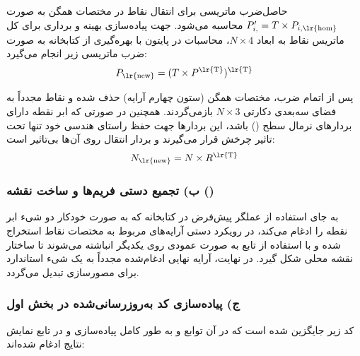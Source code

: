 \documentclass[12pt,a4paper]{article}
\begin{document}
حاصل‌ضرب ماتریسی برای انتقال نقاط در مختصات همگن به صورت $P'_{i,\text{}}=T\times P_{i,\text{\lr{hom}}}$ محاسبه می‌شود. جهت پیاده‌سازی بهینه و برداری برای کل ماتریس نقاط به ابعاد $N\times4$، محاسبات در پایتون با بهره‌گیری از کتابخانه  به صورت ضرب ماتریسی زیر انجام می‌گیرد:
$$P_{\text{\lr{new}}}=(T\times P^{\text{\lr{T}}})^{\text{\lr{T}}}$$

پس از اتمام ضرب، مختصات همگن (ستون چهارم آرایه) حذف شده و نقاط مجدداً به فضای سه‌بعدی دکارتی $N\times3$ بازمی‌گردند. همچنین در صورتی که ابر نقطه دارای بردارهای نرمال سطح () باشد، این بردارها جهت حفظ راستای هندسی خود تنها تحت تاثیر چرخش قرار می‌گیرند و بردار انتقال روی آن‌ها بی‌تاثیر است:
$$N_{\text{\lr{new}}}=N\times R^{\text{\lr{T}}}$$

\subsubsection*{ب) تجمیع دستی فریم‌ها و ساخت نقشه ()}
به جای استفاده از عملگر پیش‌فرض \lr{+} در کتابخانه  که به صورت خودکار دو شیء ابر نقطه را ادغام می‌کند، در رویکرد دستی آرایه‌های  مربوط به مختصات نقاط استخراج شده و با استفاده از تابع  به صورت عمودی روی یکدیگر انباشته می‌شوند تا ساختار نقشه محلی شکل گیرد. در نهایت، آرایه نهایی ادغام‌شده مجدداً به یک شیء استاندارد  برای مصورسازی تبدیل می‌گردد.

\subsubsection*{ج) پیاده‌سازی کد به‌روزرسانی‌شده در بخش اول}
کد زیر جایگزین شده است که در آن توابع  و  به طور کامل پیاده‌سازی و در تابع نمایش نتایج ادغام شده‌اند:
\end{document}
